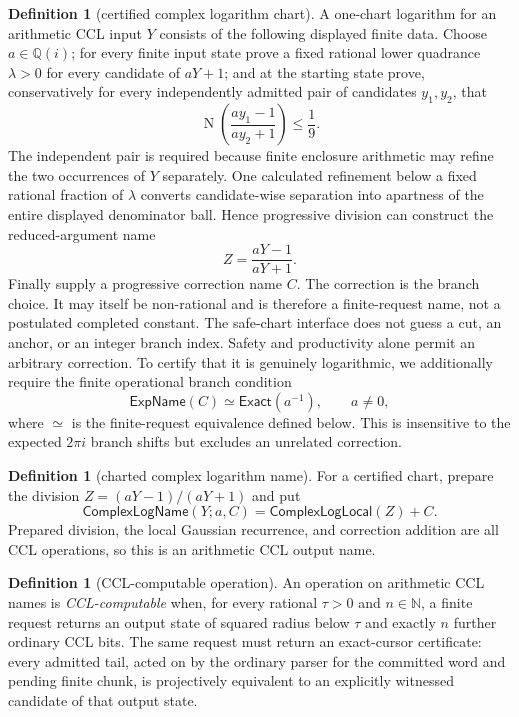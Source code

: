 \documentclass[10pt]{article}
\theoremstyle{definition}
\newtheorem{definition}[theorem]{Definition}
\theoremstyle{remark}
\newcommand{\N}{\mathbb{N}}
\newcommand{\Qi}{\mathbb{Q}(i)}
\newcommand{\Norm}{\operatorname{N}}
\begin{document}
\begin{definition}[certified complex logarithm chart]
A one-chart logarithm for an arithmetic CCL input $Y$ consists of the
following displayed finite data.  Choose $a\in\Qi$; for every finite input state prove a
fixed rational lower quadrance $\lambda>0$ for every candidate of $aY+1$;
and at the starting state prove, conservatively for every independently
admitted pair of candidates $y_1,y_2$, that
\[
 \Norm\!\left(\frac{ay_1-1}{ay_2+1}\right)\le\frac19.
 \tag{3.25}
\]
The independent pair is required because finite enclosure arithmetic may
refine the two occurrences of $Y$ separately.  One calculated refinement
below a fixed rational fraction of $\lambda$ converts candidate-wise
separation into apartness of the entire displayed denominator ball.  Hence
progressive division can construct the reduced-argument name
\[
 Z=\frac{aY-1}{aY+1}.
\]
Finally supply a progressive correction name $C$.
The correction is the branch choice.  It may itself be non-rational and is
therefore a finite-request name, not a postulated completed constant.  The
safe-chart interface does not guess a cut, an anchor, or an integer branch
index.  Safety and productivity alone permit an arbitrary correction.  To
certify that it is genuinely logarithmic, we additionally require the finite
operational branch condition
\[
 \mathsf{ExpName}(C)\simeq \mathsf{Exact}(a^{-1}),
 \qquad a\ne0,
\tag{3.26a}
\]
where $\simeq$ is the finite-request equivalence defined below.  This is
insensitive to the expected $2\pi i$ branch shifts but excludes an unrelated
correction.
\end{definition}

\begin{definition}[charted complex logarithm name]
For a certified chart, prepare the division
$Z=(aY-1)/(aY+1)$ and put
\[
 \mathsf{ComplexLogName}(Y;a,C)
   =\mathsf{ComplexLogLocal}(Z)+C.
\tag{3.26}
\]
Prepared division, the local Gaussian recurrence, and correction addition
are all CCL operations, so this is an arithmetic CCL output name.
\end{definition}

\begin{definition}[CCL-computable operation]
An operation on arithmetic CCL names is \emph{CCL-computable} when, for every
rational $\tau>0$ and $n\in\N$, a finite request returns an output state of
squared radius below $\tau$ and exactly $n$ further ordinary CCL bits.  The
same request must return an exact-cursor certificate: every admitted tail,
acted on by the ordinary parser for the committed word and pending finite
chunk, is projectively equivalent to an explicitly witnessed candidate of
that output state.
\end{definition}
\end{document}
